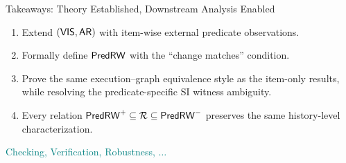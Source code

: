 
\begin{frame}{Takeaways: Theory Established, Downstream Analysis Enabled}
  \begin{enumerate}
    \setlength\itemsep{1.0em}
    \item {}
      Extend $(\mathsf{VIS},\mathsf{AR})$ with item-wise external predicate observations.
    \item {}
      Formally define $\mathsf{PredRW}$ with the ``change matches'' condition.
    \item {}
      Prove the same execution--graph equivalence style as the item-only results, while
      resolving the predicate-specific SI witness ambiguity.
    \item {}
      Every relation $\mathsf{PredRW}^{+} \subseteq \mathcal{R} \subseteq \mathsf{PredRW}^{-}$
      preserves the same history-level characterization.
  \end{enumerate}
  \vspace{0.5em}
  \begin{center}
    \textcolor{teal}{Checking, Verification, Robustness, $\ldots$}
  \end{center}
\end{frame}